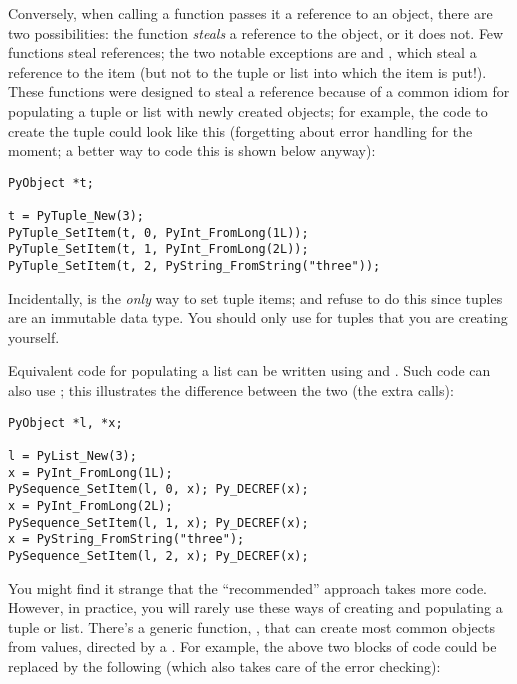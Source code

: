 \documentclass{manual}
\begin{document}
Conversely, when calling a function passes it a reference to an 
object, there are two possibilities: the function \emph{steals} a 
reference to the object, or it does not.  Few functions steal 
references; the two notable exceptions are
 and , which
steal a reference to the item (but not to the tuple or list into which
the item is put!).  These functions were designed to steal a reference
because of a common idiom for populating a tuple or list with newly
created objects; for example, the code to create the tuple  could look like this (forgetting about error handling for
the moment; a better way to code this is shown below anyway):

\begin{verbatim}
PyObject *t;

t = PyTuple_New(3);
PyTuple_SetItem(t, 0, PyInt_FromLong(1L));
PyTuple_SetItem(t, 1, PyInt_FromLong(2L));
PyTuple_SetItem(t, 2, PyString_FromString("three"));
\end{verbatim}

Incidentally,  is the \emph{only} way to
set tuple items;  and
 refuse to do this since tuples are an
immutable data type.  You should only use
 for tuples that you are creating
yourself.

Equivalent code for populating a list can be written using 
 and .  Such code
can also use ; this illustrates the
difference between the two (the extra  calls):

\begin{verbatim}
PyObject *l, *x;

l = PyList_New(3);
x = PyInt_FromLong(1L);
PySequence_SetItem(l, 0, x); Py_DECREF(x);
x = PyInt_FromLong(2L);
PySequence_SetItem(l, 1, x); Py_DECREF(x);
x = PyString_FromString("three");
PySequence_SetItem(l, 2, x); Py_DECREF(x);
\end{verbatim}

You might find it strange that the ``recommended'' approach takes more
code.  However, in practice, you will rarely use these ways of
creating and populating a tuple or list.  There's a generic function,
, that can create most common objects from
\C{} values, directed by a .  For example, the
above two blocks of code could be replaced by the following (which
also takes care of the error checking):
\end{document}

